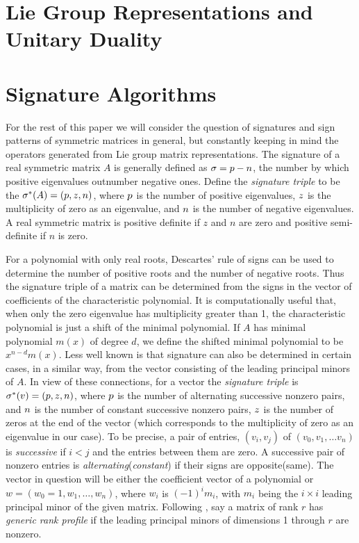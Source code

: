 \documentclass{acm_proc_article-sp}
\begin{document}
\section{Lie Group Representations and Unitary Duality}


\section{Signature Algorithms} %

For the rest of this paper we will consider the question of signatures and
sign patterns
of symmetric matrices in general, but constantly keeping in mind the 
operators generated from Lie group matrix representations.
The signature of a real symmetric matrix $A$ is 
generally defined as $\sigma = p - n$, the number by which positive eigenvalues 
outnumber negative ones.  
Define the {\em signature triple} to be the 
$\sigma^{*}(A) = (p, z, n)$, 
where $p$ is the number of positive eigenvalues, $z$ is the 
multiplicity of zero as an eigenvalue, and $n$ is the number of negative eigenvalues.
A real symmetric matrix is 
positive definite if $z$ and $n$ are zero and 
positive semi-definite if $n$ is zero.

For a polynomial with only real roots, Descartes' rule of signs can be used to 
determine the number of positive roots and the number of negative roots.
Thus the signature triple of a matrix can be determined from the signs in 
the vector of coefficients of the characteristic polynomial.  
It is computationally useful that,
when only the zero eigenvalue has multiplicity greater
than 1, the characteristic polynomial is just a shift of the minimal 
polynomial.  If $A$ has minimal polynomial $m(x)$ of degree $d$, we define
the shifted minimal polynomial to be $x^{n-d} m(x)$.  
Less well known
is that signature can also be determined in certain cases, in a similar way, 
from the vector consisting of the leading principal minors of $A$. 
In view of these connections, for a vector the {\em signature triple} 
is 
$\sigma^{*}(v) = (p, z, n)$, where
$p$ is the number of alternating successive nonzero pairs, and 
$n$ is the number of constant successive nonzero pairs,
$z$ is the number of zeros at the end of the vector
(which corresponds to the multiplicity of zero as an eigenvalue in our case).
To be precise, 
a pair of entries, $(v_i, v_j)$ of $(v_0, v_1, \ldots v_n)$ is {\em successive} 
if $i < j$ and the entries between them are zero.
A successive pair of nonzero entries is {\em alternating}({\em constant}) if 
their signs are opposite(same).
The vector in question will be either the coefficient vector of a polynomial or 
$w = (w_0 = 1, w_1, \ldots, w_n)$, where $w_i$ is $(-1)^i m_i$, with $m_i$ being
the $i\times i$ leading principal minor of the given matrix. 
Following \cite{KaLo96:issac},
say a matrix of rank $r$ has 
{\em generic rank profile} if the leading principal minors 
of dimensions 1 through $r$ are nonzero. 
\end{document}
